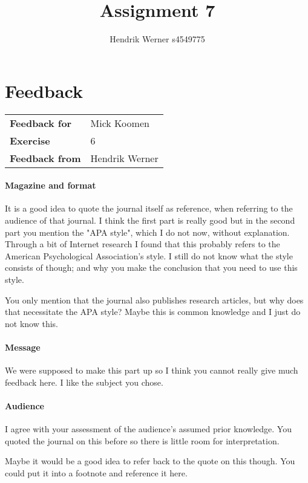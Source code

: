 \documentclass[12pt, a4paper]{article}
\title{Assignment 7}
\author{Hendrik Werner s4549775}
\begin{document}
\maketitle

\clearpage
\section*{Feedback}
\begin{tabular}{l l}
	\textbf{Feedback for} & Mick Koomen\\
	\textbf{Exercise} & 6\\
	\textbf{Feedback from} & Hendrik Werner\\
\end{tabular}

\paragraph{Magazine and format}
It is a good idea to quote the journal itself as reference, when referring to the audience of that journal. I think the first part is really good but in the second part you mention the "APA style", which I do not now, without explanation. Through a bit of Internet research I found that this probably refers to the American Psychological Association's style. I still do not know what the style consists of though; and why you make the conclusion that you need to use this style.

You only mention that the journal also publishes research articles, but why does that necessitate the APA style? Maybe this is common knowledge and I just do not know this.

\paragraph{Message}
We were supposed to make this part up so I think you cannot really give much feedback here. I like the subject you chose.

\paragraph{Audience}
I agree with your assessment of the audience's assumed prior knowledge. You quoted the journal on this before so there is little room for interpretation.

Maybe it would be a good idea to refer back to the quote on this though. You could put it into a footnote and reference it here.
\end{document}
